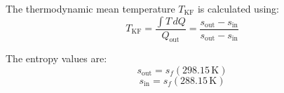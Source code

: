 The thermodynamic mean temperature \( T_{\text{KF}} \) is calculated using:  
\[
T_{\text{KF}} = \frac{\int T \, dQ}{Q_{\text{out}}} = \frac{s_{\text{out}} - s_{\text{in}}}{s_{\text{out}} - s_{\text{in}}}
\]  

The entropy values are:  
\[
s_{\text{out}} = s_f(298.15 \, \text{K})
\]  
\[
s_{\text{in}} = s_f(288.15 \, \text{K})
\]
